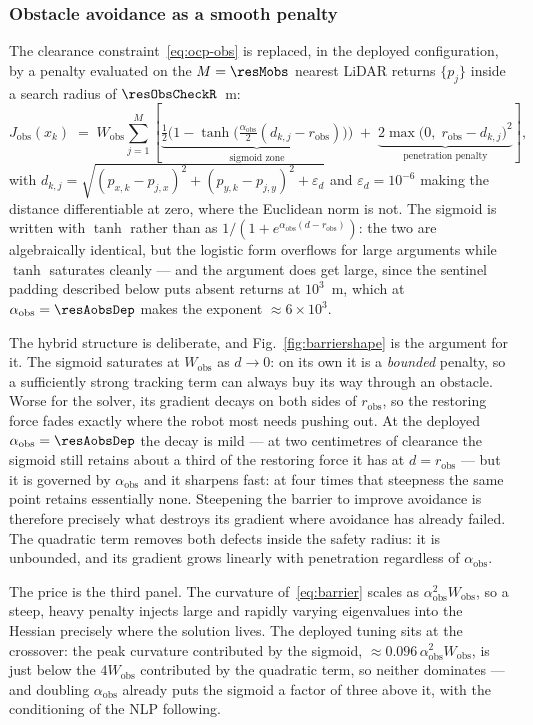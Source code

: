 \documentclass[11pt,a4paper]{article}
\newcommand{\Jobs}{J_{\mathrm{obs}}}
\newcommand{\Wobs}{W_{\mathrm{obs}}}
\newcommand{\aobs}{\alpha_{\mathrm{obs}}}
\newcommand{\robs}{r_{\mathrm{obs}}}
\begin{document}
\subsubsection{Obstacle avoidance as a smooth penalty}
\label{sec:barrier}

The clearance constraint~\eqref{eq:ocp-obs} is replaced, in the deployed configuration, by a penalty
evaluated on the $M=\resMobs$ nearest LiDAR returns $\{p_j\}$ inside a search radius of
$\resObsCheckR$~m:
\begin{equation}
  \Jobs(x_k) \;=\; \Wobs\sum_{j=1}^{M}
  \left[\underbrace{\tfrac12\Big(1-\tanh\big(\tfrac{\aobs}{2}(d_{k,j}-\robs)\big)\Big)}_{\text{sigmoid zone}}
  \;+\;\underbrace{2\max\!\big(0,\;\robs-d_{k,j}\big)^2}_{\text{penetration penalty}}\right],
  \label{eq:barrier}
\end{equation}
with $d_{k,j}=\sqrt{(p_{x,k}-p_{j,x})^2+(p_{y,k}-p_{j,y})^2+\varepsilon_d}$ and $\varepsilon_d=10^{-6}$ making
the distance differentiable at zero, where the Euclidean norm is not. The sigmoid is written with $\tanh$
rather than as $1/(1+e^{\aobs(d-\robs)})$: the two are algebraically identical, but the logistic form
overflows for large arguments while $\tanh$ saturates cleanly --- and the argument does get large, since
the sentinel padding described below puts absent returns at $10^3$~m, which at $\aobs=\resAobsDep$ makes
the exponent $\approx6\times10^{3}$.

The hybrid structure is deliberate, and Fig.~\ref{fig:barriershape} is the argument for it. The sigmoid
saturates at $\Wobs$ as $d\to0$: on its own it is a \emph{bounded} penalty, so a sufficiently strong
tracking term can always buy its way through an obstacle. Worse for the solver, its gradient decays on both
sides of $\robs$, so the restoring force fades exactly where the robot most needs pushing out. At the
deployed $\aobs=\resAobsDep$ the decay is mild --- at two centimetres of clearance the sigmoid still
retains about a third of the restoring force it has at $d=\robs$ --- but it is governed by $\aobs$ and it
sharpens fast: at four times that steepness the same point retains essentially none. Steepening the barrier
to improve avoidance is therefore precisely what destroys its gradient where avoidance has already failed.
The quadratic term removes both defects inside the safety radius: it is unbounded, and its gradient grows
linearly with penetration regardless of $\aobs$.

The price is the third panel. The curvature of~\eqref{eq:barrier} scales as $\aobs^2\Wobs$, so a steep,
heavy penalty injects large and rapidly varying eigenvalues into the Hessian precisely where the solution
lives. The deployed tuning sits at the crossover: the peak curvature contributed by the sigmoid,
$\approx0.096\,\aobs^2\Wobs$, is just below the $4\Wobs$ contributed by the quadratic term, so neither
dominates --- and doubling $\aobs$ already puts the sigmoid a factor of three above it, with the
conditioning of the NLP following.
\end{document}

